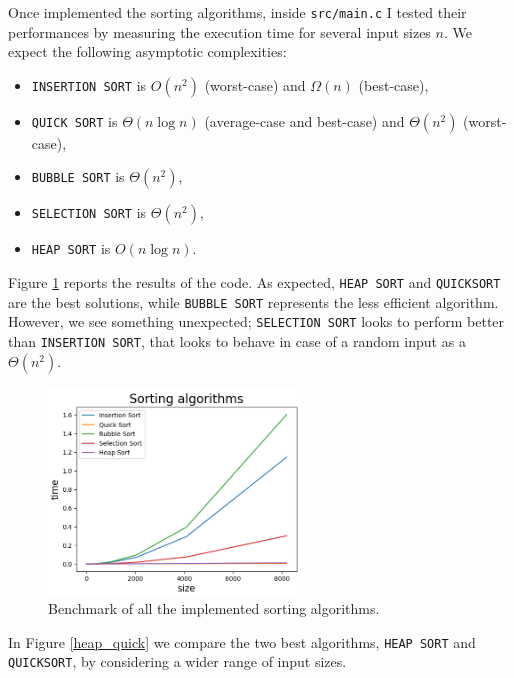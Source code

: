 \documentclass{article}
\begin{document}
	\noindent Once implemented the sorting algorithms, inside \texttt{src/main.c} I tested their performances by measuring the execution time for several input sizes $n$. We expect the following asymptotic complexities:
	\begin{itemize}
		\item \texttt{INSERTION SORT} is $O(n^2)$ (worst-case) and $\Omega(n)$ (best-case), 
		\item  \texttt{QUICK SORT} is $\Theta(n\log n)$ (average-case and best-case) and $\Theta(n^2)$ (worst-case),
		\item \texttt{BUBBLE SORT} is $\Theta(n^2)$,
		\item \texttt{SELECTION SORT} is $\Theta(n^2)$,
		\item \texttt{HEAP SORT} is $O(n\log n)$.
	\end{itemize}
	Figure \ref*{sortings} reports the results of the code. As expected, \texttt{HEAP SORT} and \texttt{QUICKSORT} are the best solutions, while \texttt{BUBBLE SORT} represents the less efficient algorithm. However, we see something unexpected; \texttt{SELECTION SORT} looks to perform better than \texttt{INSERTION SORT}, that looks to behave in case of a random input as a $\Theta(n^2)$. 
	\newpage
	\begin{figure}[t]
		\centering
		\includegraphics[width=0.6\textwidth]{../plots/sorting_plot.png}  
		\caption{Benchmark of all the implemented sorting algorithms.}
		\label{sortings}
	\end{figure}
	\noindent In Figure \ref{heap_quick} we compare the two best algorithms, \texttt{HEAP SORT} and \texttt{QUICKSORT}, by considering a wider range of input sizes. 
	
\end{document}
